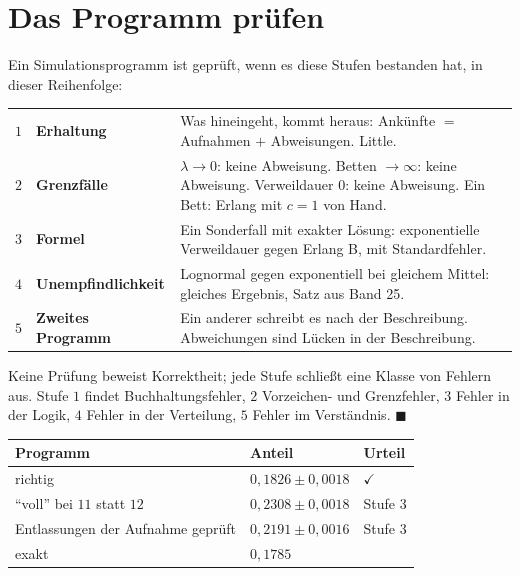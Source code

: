 \section{Das Programm prüfen}

\begin{merksatz}
Ein Simulationsprogramm ist geprüft, wenn es diese Stufen bestanden hat, in dieser Reihenfolge:
\begin{center}
{\small
\renewcommand{\arraystretch}{1.5}
\begin{tabular}{@{}P{0.6cm}P{3.0cm}P{4.8cm}@{}}
\toprule
$1$ & \textbf{Erhaltung} & Was hineingeht, kommt heraus: Ankünfte $=$ Aufnahmen $+$ Abweisungen. Little.\\
$2$ & \textbf{Grenzfälle} & $\lambda\to0$: keine Abweisung. Betten $\to\infty$: keine Abweisung. Verweildauer $0$: keine Abweisung. Ein Bett: Erlang mit $c=1$ von Hand.\\
$3$ & \textbf{Formel} & Ein Sonderfall mit exakter Lösung: exponentielle Verweildauer gegen Erlang B, mit Standardfehler.\\
$4$ & \textbf{Unempfind\-lichkeit} & Lognormal gegen exponentiell bei gleichem Mittel: gleiches Ergebnis, Satz aus Band 25.\\
$5$ & \textbf{Zweites Programm} & Ein anderer schreibt es nach der Beschreibung. Abweichungen sind Lücken in der Beschreibung.\\
\bottomrule
\end{tabular}}
\end{center}

Keine Prüfung beweist Korrektheit; jede Stufe schließt eine Klasse von Fehlern aus. Stufe $1$ findet Buchhaltungsfehler, $2$ Vorzeichen- und Grenzfehler, $3$ Fehler in der Logik, $4$ Fehler in der Verteilung, $5$ Fehler im Verständnis. $\blacksquare$

\begin{center}
{\small
\renewcommand{\arraystretch}{1.48}
\begin{tabular}{@{}P{4.0cm}P{2.6cm}P{1.8cm}@{}}
\toprule
\textbf{Programm} & \textbf{Anteil} & \textbf{Urteil}\\
\midrule
richtig & $0{,}1826\pm0{,}0018$ & $\checkmark$\\
\enquote{voll} bei $11$ statt $12$ & $0{,}2308\pm0{,}0018$ & Stufe 3\\
Entlassungen  der Aufnahme geprüft & $0{,}2191\pm0{,}0016$ & Stufe 3\\
\midrule
exakt & $0{,}1785$ & \\
\bottomrule
\end{tabular}}
\end{center}


\end{merksatz}
